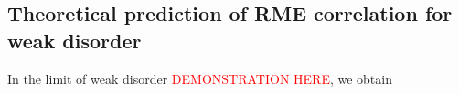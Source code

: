 \documentclass[aps,prl,twocolumn, amsmath,amssymb,superscriptaddress]{revtex4-2}
\DeclarePairedDelimiter\bra{\langle}{\rvert}
\DeclarePairedDelimiter\ket{\lvert}{\rangle}
\newcommand{\new}[1]{\textcolor{red}{#1}}
\begin{document}







\subsection{Theoretical prediction of RME  correlation for weak disorder}

In the limit of weak disorder \new{DEMONSTRATION HERE},
we obtain



\end{document}
